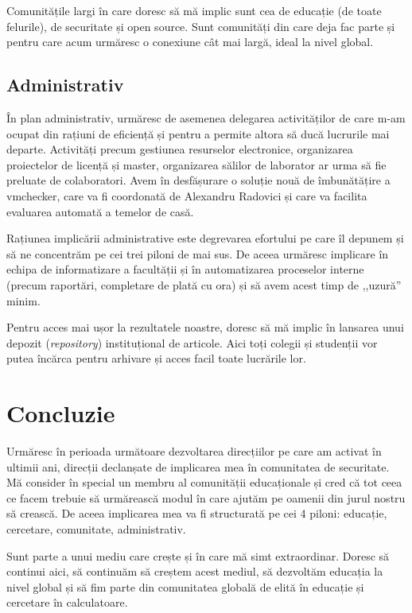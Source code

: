 \documentclass[11pt,a4paper]{article}
\begin{document}
Comunitățile largi în care doresc să mă implic sunt cea de educație (de toate felurile), de securitate și open source. Sunt comunități din care deja fac parte și pentru care acum urmăresc o conexiune cât mai largă, ideal la nivel global.

\subsection*{Administrativ}

În plan administrativ, urmăresc de asemenea delegarea activităților de care m-am ocupat din rațiuni de eficiență și pentru a permite altora să ducă lucrurile mai departe. Activități precum gestiunea resurselor electronice, organizarea proiectelor de licență și master, organizarea sălilor de laborator ar urma să fie preluate de colaboratori. Avem în desfășurare o soluție nouă de îmbunătățire a vmchecker, care va fi coordonată de Alexandru Radovici și care va facilita evaluarea automată a temelor de casă.

Rațiunea implicării administrative este degrevarea efortului pe care îl depunem și să ne concentrăm pe cei trei piloni de mai sus. De aceea urmăresc implicare în echipa de informatizare a facultății și în automatizarea proceselor interne (precum raportări, completare de plată cu ora) și să avem acest timp de ,,uzură'' minim.

Pentru acces mai ușor la rezultatele noastre, doresc să mă implic în lansarea unui depozit (\textit{repository}) instituțional de articole. Aici toți colegii și studenții vor putea încărca pentru arhivare și acces facil toate lucrările lor.

\section*{Concluzie}

Urmăresc în perioada următoare dezvoltarea direcțiilor pe care am activat în ultimii ani, direcții declanșate de implicarea mea în comunitatea de securitate. Mă consider în special un membru al comunității educaționale și cred că tot ceea ce facem trebuie să urmărească modul în care ajutăm pe oamenii din jurul nostru să crească. De aceea implicarea mea va fi structurată pe cei 4 piloni: educație, cercetare, comunitate, administrativ.

Sunt parte a unui mediu care crește și în care mă simt extraordinar. Doresc să continui aici, să continuăm să creștem acest mediul, să dezvoltăm educația la nivel global și să fim parte din comunitatea globală de elită în educație și cercetare în calculatoare.
\end{document}
